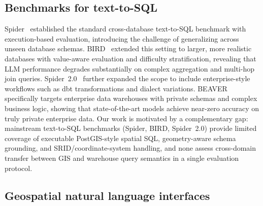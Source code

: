 \documentclass[11pt]{article}
\begin{document}
\subsection{Benchmarks for text-to-SQL}

Spider~\cite{yu2018spider} established the standard cross-database text-to-SQL benchmark with execution-based evaluation, introducing the challenge of generalizing across unseen database schemas. BIRD~\cite{li2023bird} extended this setting to larger, more realistic databases with value-aware evaluation and difficulty stratification, revealing that LLM performance degrades substantially on complex aggregation and multi-hop join queries. Spider~2.0~\cite{lei2025spider2} further expanded the scope to include enterprise-style workflows such as dbt transformations and dialect variations. BEAVER~\cite{chen2024beaver} specifically targets enterprise data warehouses with private schemas and complex business logic, showing that state-of-the-art models achieve near-zero accuracy on truly private enterprise data. Our work is motivated by a complementary gap: mainstream text-to-SQL benchmarks (Spider, BIRD, Spider~2.0) provide limited coverage of executable PostGIS-style spatial SQL, geometry-aware schema grounding, and SRID/coordinate-system handling, and none assess cross-domain transfer between GIS and warehouse query semantics in a single evaluation protocol.

\subsection{Geospatial natural language interfaces}
\end{document}
